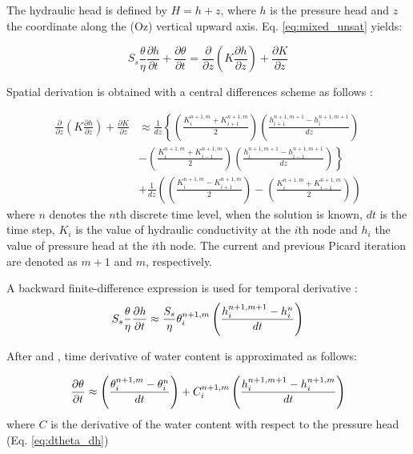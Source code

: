 \documentclass[a4paper,12pt]{article}
\begin{document}
The hydraulic head is defined by $H = h + z$, where $h$ is the pressure head and $z$ the coordinate along the (Oz) vertical upward axis. Eq. \ref{eq:mixed_unsat} yields: 

\begin{equation}
    S_s \frac{\theta}{\eta} \frac{\partial h}{\partial t} + \frac{\partial \theta}{\partial t} =
	 \frac{\partial}{\partial z} \left( K \frac{\partial h}{\partial z} \right) + \frac{\partial K}{\partial z}
    \label{eq:mixed_unsat2}
\end{equation}

Spatial derivation is obtained with a central differences scheme as follows : 

\begin{align}
      \frac{\partial}{\partial z} \left( K \frac{\partial h}{\partial z} \right) + \frac{\partial K}{\partial z} & \approx  \frac{1}{dz} \left\{ \left(\frac{K_i^{n+1,m}+K_{i+1}^{n+1,m}}{2}\right) \left(\frac{h_{i+1}^{n+1,m+1} - h_i^{n+1,m+1}}{dz} \right) \right. \nonumber \\
      &  - \left. \left(\frac{K_i^{n+1,m}+K_{i-1}^{n+1,m}}{2}\right) \left(\frac{h_{i}^{n+1,m+1} - h_{i-1}^{n+1,m+1}}{dz} \right)  \right\} \nonumber  \\
      & + \frac{1}{dz} \left( \left(\frac{K_i^{n+1,m}-K_{i+1}^{n+1,m}}{2}\right) - \left(\frac{K_i^{n+1,m}+K_{i-1}^{n+1,m}}{2}  \right) \right)  
    \label{eq:space_discret}
\end{align}
where $n$ denotes the $n$th discrete time level, when the solution is known, $dt$ is the time step, $K_i$ is the value of hydraulic conductivity at the $i$th node and $h_i$ the value of pressure head at the $i$th node. The current and previous Picard iteration are denoted as $m+1$ and $m$, respectively.

A backward finite-difference expression is used for temporal derivative : 
\begin{equation}
    S_s \frac{\theta}{\eta} \frac{\partial h}{\partial t} \approx \frac{S_s}{\eta}\theta_i^{n+1,m} \left( { h_i^{n+1,m+1} - h_i^n \over dt} \right)
    \label{eq:dh_temp_deriv}
\end{equation}

After \cite{Celiaetal1990} and \cite{Clementetal1994}, time derivative of water content is approximated as follows:

\begin{equation}
    \frac{\partial \theta}{\partial t} \approx \left( {\theta_i^{n+1,m} - \theta_i^n \over dt} \right) + C_i^{n+1,m} \left( {h_i^{n+1,m+1}-h_i^{n+1,m} \over dt} \right)
    \label{eq:theta_temp_deriv}
\end{equation}
where $C$ is the derivative of the water content with respect to the pressure head (Eq. \ref{eq:dtheta_dh})
\end{document}
